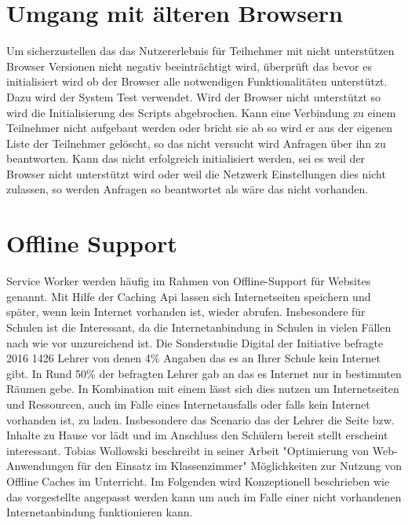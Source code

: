 \section{Umgang mit älteren Browsern}
Um sicherzustellen das das Nutzererlebnis für Teilnehmer mit nicht unterstützen Browser Versionen nicht negativ beeinträchtigt wird, überprüft das \cdn bevor es initialisiert wird ob der Browser alle notwendigen Funktionalitäten unterstützt. Dazu wird der System Test verwendet. Wird der Browser nicht unterstützt so wird die Initialisierung des Scripts abgebrochen. 
Kann eine Verbindung zu einem Teilnehmer nicht aufgebaut werden oder bricht sie ab so wird er aus der eigenen Liste der Teilnehmer gelöscht, so das nicht versucht wird Anfragen über ihn zu beantworten. 
Kann das \cdn nicht erfolgreich initialisiert werden, sei es weil der Browser nicht unterstützt wird oder weil die Netzwerk Einstellungen dies nicht zulassen, so werden Anfragen so beantwortet als wäre das \cdn nicht vorhanden.


\section{Offline Support}

Service Worker werden häufig im Rahmen von Offline-Support für Websites genannt. Mit Hilfe der Caching Api lassen sich Internetseiten speichern und später, wenn kein Internet vorhanden ist, wieder abrufen. Insbesondere für Schulen ist die Interessant, da die Internetanbindung in Schulen in vielen Fällen nach wie vor unzureichend ist. Die Sonderstudie Digital der Initiative befragte 2016 1426 Lehrer von denen 4\% Angaben das es an Ihrer Schule kein Internet gibt. In Rund 50\% der befragten Lehrer gab an das es Internet nur in bestimmten Räumen gebe.\cite{sonderstudie_digital} In Kombination mit einem \pTp \cdn lässt sich dies nutzen um Internetseiten und Ressourcen, auch im Falle eines Internetausfalls oder falls kein Internet vorhanden ist, zu laden. Insbesondere das Scenario das der Lehrer die Seite bzw. Inhalte zu Hause vor lädt und im Anschluss den Schülern bereit stellt erscheint interessant. Tobias Wollowski beschreibt in seiner Arbeit "Optimierung von Web-Anwendungen für den Einsatz im Klassenzimmer"\cite{tobi} Möglichkeiten zur Nutzung von Offline Caches im Unterricht. Im Folgenden wird Konzeptionell beschrieben wie das vorgestellte \pTp \cdn angepasst werden kann um auch im Falle einer nicht vorhandenen Internetanbindung funktionieren kann.

